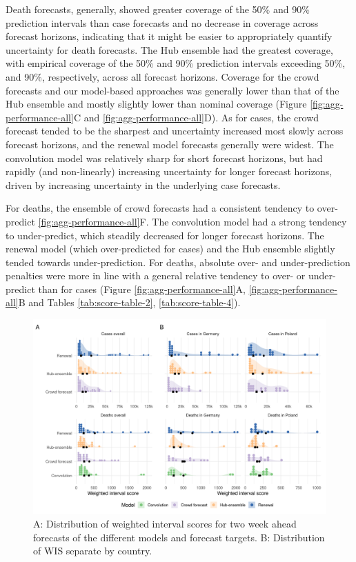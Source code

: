 \documentclass[
]{article}
\begin{document}
Death forecasts, generally, showed greater coverage of the 50\% and 90\% prediction intervals than case forecasts and no decrease in coverage across forecast horizons, indicating that it might be easier to appropriately quantify uncertainty for death forecasts. The Hub ensemble had the greatest coverage, with empirical coverage of the 50\% and 90\% prediction intervals exceeding 50\%, and 90\%, respectively, across all forecast horizons. Coverage for the crowd forecasts and our model-based approaches was generally lower than that of the Hub ensemble and mostly slightly lower than nominal coverage (Figure \ref{fig:agg-performance-all}C and \ref{fig:agg-performance-all}D). As for cases, the crowd forecast tended to be the sharpest and uncertainty increased most slowly across forecast horizons, and the renewal model forecasts generally were widest. The convolution model was relatively sharp for short forecast horizons, but had rapidly (and non-linearly) increasing uncertainty for longer forecast horizons, driven by increasing uncertainty in the underlying case forecasts.

For deaths, the ensemble of crowd forecasts had a consistent tendency to over-predict \ref{fig:agg-performance-all}F. The convolution model had a strong tendency to under-predict, which steadily decreased for longer forecast horizons. The renewal model (which over-predicted for cases) and the Hub ensemble slightly tended towards under-prediction. For deaths, absolute over- and under-prediction penalties were more in line with a general relative tendency to over- or under-predict than for cases (Figure \ref{fig:agg-performance-all}A, \ref{fig:agg-performance-all}B and Tables \ref{tab:score-table-2}, \ref{tab:score-table-4}).

\begin{figure}[H]
\includegraphics[width=1\linewidth,]{../analysis/plots/distribution_scores_wis-2} \caption{A: Distribution of weighted interval scores for two week ahead forecasts of the different models and forecast targets. B: Distribution of WIS separate by country.}\label{fig:distribution-scores}
\end{figure}
\end{document}
